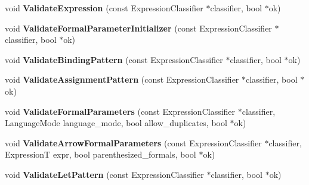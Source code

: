 \begin{DoxyCompactItemize}
\item 
void {\bfseries Validate\+Expression} (const Expression\+Classifier $\ast$classifier, bool $\ast$ok)\hypertarget{classv8_1_1internal_1_1_parser_base_a66dcb1e0f1107e45a13464c037a611ad}{}\label{classv8_1_1internal_1_1_parser_base_a66dcb1e0f1107e45a13464c037a611ad}

\item 
void {\bfseries Validate\+Formal\+Parameter\+Initializer} (const Expression\+Classifier $\ast$classifier, bool $\ast$ok)\hypertarget{classv8_1_1internal_1_1_parser_base_a6a1aab21d071c1845bdbe62ff10c50f0}{}\label{classv8_1_1internal_1_1_parser_base_a6a1aab21d071c1845bdbe62ff10c50f0}

\item 
void {\bfseries Validate\+Binding\+Pattern} (const Expression\+Classifier $\ast$classifier, bool $\ast$ok)\hypertarget{classv8_1_1internal_1_1_parser_base_a568740226c676d0731a138d0ba75cbb2}{}\label{classv8_1_1internal_1_1_parser_base_a568740226c676d0731a138d0ba75cbb2}

\item 
void {\bfseries Validate\+Assignment\+Pattern} (const Expression\+Classifier $\ast$classifier, bool $\ast$ok)\hypertarget{classv8_1_1internal_1_1_parser_base_a1c6a34166b1ba3661afe15634cf2d1eb}{}\label{classv8_1_1internal_1_1_parser_base_a1c6a34166b1ba3661afe15634cf2d1eb}

\item 
void {\bfseries Validate\+Formal\+Parameters} (const Expression\+Classifier $\ast$classifier, Language\+Mode language\+\_\+mode, bool allow\+\_\+duplicates, bool $\ast$ok)\hypertarget{classv8_1_1internal_1_1_parser_base_acc6c46d6961d0713ef2f2ed65aa00eb8}{}\label{classv8_1_1internal_1_1_parser_base_acc6c46d6961d0713ef2f2ed65aa00eb8}

\item 
void {\bfseries Validate\+Arrow\+Formal\+Parameters} (const Expression\+Classifier $\ast$classifier, ExpressionT expr, bool parenthesized\+\_\+formals, bool $\ast$ok)\hypertarget{classv8_1_1internal_1_1_parser_base_acd280374d408d103e64a0c32769e4f5f}{}\label{classv8_1_1internal_1_1_parser_base_acd280374d408d103e64a0c32769e4f5f}

\item 
void {\bfseries Validate\+Let\+Pattern} (const Expression\+Classifier $\ast$classifier, bool $\ast$ok)\hypertarget{classv8_1_1internal_1_1_parser_base_a923665fa1ceb040549a4c0c2c062df71}{}\label{classv8_1_1internal_1_1_parser_base_a923665fa1ceb040549a4c0c2c062df71}


\end{DoxyCompactItemize}
